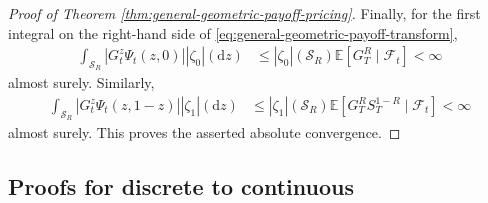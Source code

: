 \documentclass[10pt,a4paper,reqno]{amsart}
\theoremstyle{plain}
\theoremstyle{definition}
\theoremstyle{remark}
\theoremstyle{example}
\begin{document}
\begin{proof}[Proof of Theorem \ref{thm:general-geometric-payoff-pricing}]
    Finally, for the first integral on the right-hand side of
    \eqref{eq:general-geometric-payoff-transform},
    \begin{align*}
        \int_{\mathcal{S}_R} \left| G_t^z\Psi_t(z,0) \right| |\zeta_0|(\mathrm{d}z) &\leq |\zeta_0|(\mathcal{S}_R) \mathbb{E}\left[ G_T^R \mid\mathcal{F}_t \right] < \infty
    \end{align*}
    almost surely. Similarly,
    \begin{align*}
        \int_{\mathcal{S}_R} \left| G_t^z\Psi_t(z,1-z) \right| |\zeta_1|(\mathrm{d}z) &\leq |\zeta_1|(\mathcal{S}_R) \mathbb{E}\left[ G_T^R S_T^{1-R} \mid\mathcal{F}_t \right] < \infty
    \end{align*}
    almost surely. This proves the asserted absolute convergence.
\end{proof}

\subsection{Proofs for discrete to continuous}\label{sec:proof-discrete-to-continuous}
\end{document}
